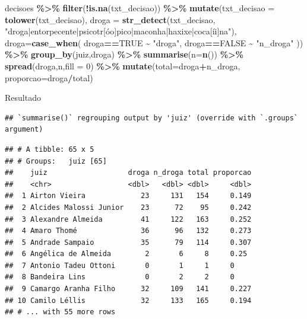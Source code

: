 \documentclass[
  9pt,
  ignorenonframetext,
]{beamer}
\newenvironment{Shaded}{\begin{snugshade}}{\end{snugshade}}
\newcommand{\DataTypeTok}[1]{\textcolor[rgb]{0.13,0.29,0.53}{#1}}
\newcommand{\DecValTok}[1]{\textcolor[rgb]{0.00,0.00,0.81}{#1}}
\newcommand{\KeywordTok}[1]{\textcolor[rgb]{0.13,0.29,0.53}{\textbf{#1}}}
\newcommand{\NormalTok}[1]{#1}
\newcommand{\OperatorTok}[1]{\textcolor[rgb]{0.81,0.36,0.00}{\textbf{#1}}}
\newcommand{\OtherTok}[1]{\textcolor[rgb]{0.56,0.35,0.01}{#1}}
\newcommand{\StringTok}[1]{\textcolor[rgb]{0.31,0.60,0.02}{#1}}
\begin{document}
\begin{frame}[fragile]{}
\protect\hypertarget{section-3}{}
\begin{Shaded}
\begin{Highlighting}[]
\NormalTok{decisoes }\OperatorTok{\%\textgreater{}\%}\StringTok{ }
\StringTok{  }\KeywordTok{filter}\NormalTok{(}\OperatorTok{!}\KeywordTok{is.na}\NormalTok{(txt\_decisao)) }\OperatorTok{\%\textgreater{}\%}
\StringTok{  }\KeywordTok{mutate}\NormalTok{(}\DataTypeTok{txt\_decisao =} \KeywordTok{tolower}\NormalTok{(txt\_decisao),}
         \DataTypeTok{droga =} \KeywordTok{str\_detect}\NormalTok{(txt\_decisao,}
    \StringTok{"droga|entorpecente|psicotr[óo]pico|maconha|haxixe|coca[íi]na"}\NormalTok{),}
    \DataTypeTok{droga=}\KeywordTok{case\_when}\NormalTok{(}
\NormalTok{      droga}\OperatorTok{==}\OtherTok{TRUE} \OperatorTok{\textasciitilde{}}\StringTok{ "droga"}\NormalTok{,}
\NormalTok{      droga}\OperatorTok{==}\OtherTok{FALSE} \OperatorTok{\textasciitilde{}}\StringTok{ "n\_droga"}
\NormalTok{    )) }\OperatorTok{\%\textgreater{}\%}
\StringTok{  }\KeywordTok{group\_by}\NormalTok{(juiz,droga) }\OperatorTok{\%\textgreater{}\%}
\StringTok{  }\KeywordTok{summarise}\NormalTok{(}\DataTypeTok{n=}\KeywordTok{n}\NormalTok{()) }\OperatorTok{\%\textgreater{}\%}
\StringTok{  }\KeywordTok{spread}\NormalTok{(droga,n,}\DataTypeTok{fill =} \DecValTok{0}\NormalTok{) }\OperatorTok{\%\textgreater{}\%}
\StringTok{  }\KeywordTok{mutate}\NormalTok{(}\DataTypeTok{total=}\NormalTok{droga}\OperatorTok{+}\NormalTok{n\_droga,}
         \DataTypeTok{proporcao=}\NormalTok{droga}\OperatorTok{/}\NormalTok{total)}
\end{Highlighting}
\end{Shaded}
\end{frame}

\begin{frame}[fragile]{Resultado}
\protect\hypertarget{resultado}{}
\begin{verbatim}
## `summarise()` regrouping output by 'juiz' (override with `.groups` argument)
\end{verbatim}

\begin{verbatim}
## # A tibble: 65 x 5
## # Groups:   juiz [65]
##    juiz                   droga n_droga total proporcao
##    <chr>                  <dbl>   <dbl> <dbl>     <dbl>
##  1 Airton Vieira             23     131   154     0.149
##  2 Alcides Malossi Junior    23      72    95     0.242
##  3 Alexandre Almeida         41     122   163     0.252
##  4 Amaro Thomé               36      96   132     0.273
##  5 Andrade Sampaio           35      79   114     0.307
##  6 Angélica de Almeida        2       6     8     0.25 
##  7 Antonio Tadeu Ottoni       0       1     1     0    
##  8 Bandeira Lins              0       2     2     0    
##  9 Camargo Aranha Filho      32     109   141     0.227
## 10 Camilo Léllis             32     133   165     0.194
## # ... with 55 more rows
\end{verbatim}
\end{frame}
\end{document}

